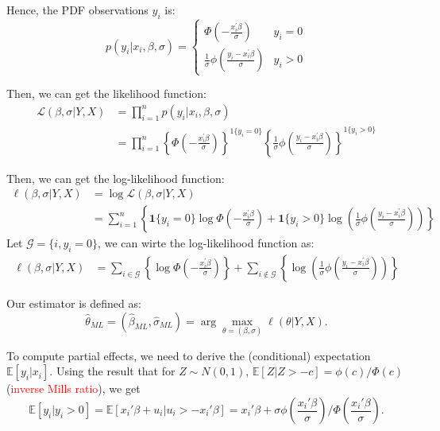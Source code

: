 Hence, the PDF observations $y_i$ is:
\[
p(y_i|x_i, \beta, \sigma) = \left\{\begin{matrix}
    \Phi\left(-\frac{x_i^{\prime} \beta}{\sigma}\right) & y_i = 0\\
    \frac{1}{\sigma} \phi\left(\frac{y_i - x_i^{\prime} \beta}{\sigma}\right) & y_i > 0
\end{matrix}\right.
\]

Then, we can get the likelihood function:
\begin{align*}
    \mathcal{L}(\beta, \sigma |Y, X) &= \prod_{i=1}^{n} p(y_i|x_i, \beta, \sigma)\\
    &= \prod_{i=1}^{n} \left\{\Phi\left(-\frac{x_i^{\prime} \beta}{\sigma}\right)\right\}^{1\{y_i=0\}} \left\{\frac{1}{\sigma} \phi\left(\frac{y_i - x_i^{\prime} \beta}{\sigma}\right)\right\}^{1\{y_i>0\}}
\end{align*}
    
Then, we can get the log-likelihood function:
\begin{align*}
    \ell(\beta, \sigma |Y, X) &= \log \mathcal{L}(\beta, \sigma | Y, X)\\
    &= \sum_{i=1}^{n} \left\{ \mathbf{1}\{y_i=0\} \log \Phi\left(-\frac{x_i^{\prime} \beta}{\sigma}\right) + \mathbf{1}\{y_i>0\} \log \left(\frac{1}{\sigma} \phi\left(\frac{y_i - x_i^{\prime} \beta}{\sigma}\right)\right)\right\}
\end{align*}
Let $\mathcal{G} = \{i, y_i = 0\}$, we can wirte the log-likelihood function as:
\begin{align*}
    \ell(\beta, \sigma |Y, X) &= \sum_{i \in \mathcal{G}} \left\{ \log \Phi\left(-\frac{x_i^{\prime} \beta}{\sigma}\right)\right\} + \sum_{i \notin \mathcal{G}} \left\{\log \left(\frac{1}{\sigma} \phi\left(\frac{y_i - x_i^{\prime} \beta}{\sigma}\right)\right)\right\}
\end{align*}

Our estimator is defined as: 
\[\hat{\theta}_{ML} = (\hat{\beta}_{ML} , \hat{\sigma}_{ML} ) = \arg \max_{\theta = (\beta, \sigma)} \ell(\theta|Y, X).
\]

To compute partial effects, 
we need to derive the (conditional) expectation $\mathbb{E}[y_i|x_i].$ 
Using the result that for $Z\sim N(0,1)$, 
$\mathbb{E}[Z|Z>-c]=\phi(c)/\Phi(c)$ (\textcolor{red}{inverse Mills ratio}), we get
\[
\mathbb{E}[y_i|y_i>0]=\mathbb{E}[x_i'\beta+u_i|u_i>-x_i'\beta]=x_i'\beta+\sigma\phi\left(\frac{x_i'\beta}{\sigma}\right)/\Phi\left(\frac{x_i'\beta}{\sigma}\right).
\]

